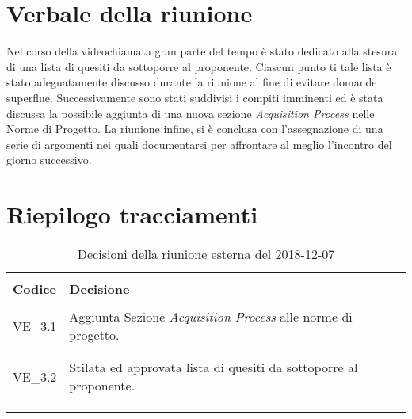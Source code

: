 \section{Verbale della riunione}
Nel corso della videochiamata gran parte del tempo è stato dedicato alla 
stesura di una lista di quesiti da sottoporre al proponente. Ciascun 
punto ti tale lista è stato adeguatamente discusso durante la riunione al fine 
di evitare domande superflue. 
\newline \newline
Successivamente sono stati suddivisi i compiti imminenti ed è stata discussa la 
possibile aggiunta di una nuova sezione \textit{Acquisition Process} nelle 
Norme di Progetto.
\newline \newline
La riunione infine, si è conclusa con l'assegnazione di una serie di argomenti 
nei quali documentarsi per affrontare al meglio l'incontro del giorno 
successivo.

\section{Riepilogo tracciamenti}
\begin{centering}
\begin{longtable}{ >{\centering}p{4cm} >{\centering}p{11cm} }

\hline
\\[0.5pt]
	\textbf{Codice} & \textbf{Decisione} 
	
	\tabularnewline 
	\hline
	
	
				\\[0.5pt]
				VE\_3.1 & Aggiunta Sezione \textit{Acquisition Process} alle 
				norme di progetto.
				\\[0.5pt]
				\tabularnewline
				\hline
				\\[0.5pt]
				VE\_3.2 & Stilata ed approvata lista di quesiti da sottoporre 
				al proponente.
				\\[0.5pt]
				\tabularnewline
				\hline
						

        \\[0.7pt]
        \caption{Decisioni della riunione esterna del 2018-12-07}
\end{longtable}
\end{centering}

